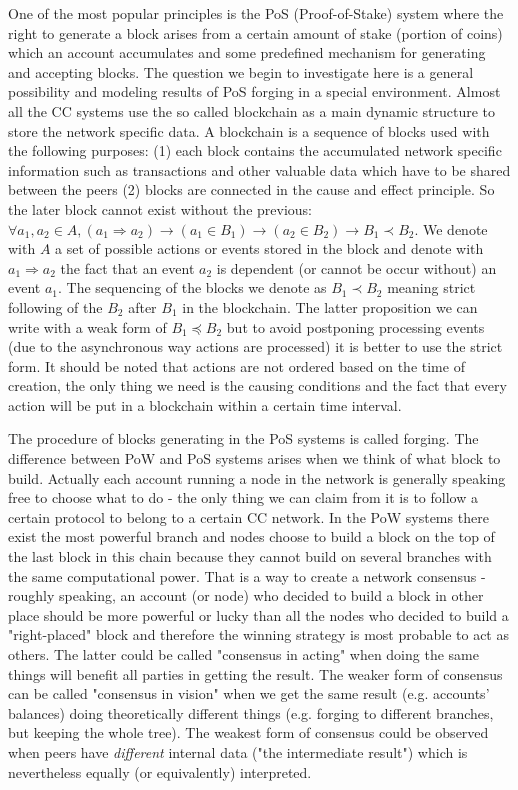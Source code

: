 \documentclass[12pt]{article}
\begin{document}
One of the most popular principles is the PoS 
(Proof-of-Stake) system where the right to generate a block arises from a certain amount of stake (portion of coins) which 
an account accumulates and some predefined mechanism for generating and accepting blocks. The question we begin to investigate here is a 
general possibility and modeling results of PoS forging in a special environment. Almost all the CC systems use the so called blockchain as a 
main dynamic structure to store the network specific data. A blockchain is a sequence of blocks used with the following purposes: (1) each block contains the 
accumulated network specific information such as transactions and other valuable data which have to be shared between the peers 
(2) blocks are connected in the cause and effect principle. So the later block cannot exist without
the previous: $\forall a_1,a_2\in A, (a_1\Rightarrow a_2) \to (a_1\in B_1) \to (a_2\in B_2) \to B_1 \prec B_2$. We denote with $A$ a set of possible actions or 
events stored in the block and denote with $a_1\Rightarrow a_2$ the fact that an event $a_2$ is dependent (or cannot be occur without) an event $a_1$. 
The sequencing of the
blocks we denote as $B_1 \prec B_2$ meaning strict following of the $B_2$ after $B_1$ in the blockchain. The latter proposition we can write with a weak form of
$B_1 \preceq B_2$ but to avoid postponing processing events (due to the asynchronous way actions are processed) it is better to use the strict form.
It should be noted
that actions are not ordered based on the time of creation, the only thing we need is the causing conditions and the fact that every action 
will be put in a blockchain within a certain time interval. 

The procedure of blocks generating in the PoS systems is called forging. The difference between PoW and PoS systems arises when we think
of what block to build. Actually each account running a node in the network is generally speaking free to choose what to do \-- the only thing we can claim from it
is to follow a certain protocol to belong to a certain CC network. In the PoW systems there exist the most powerful branch and nodes choose to 
build a block on the top of the last block in this chain because they cannot build on several branches with the same computational power. That is a way 
to create a network consensus \--
roughly speaking, an account (or node) who decided to build a block in other place should be more powerful or lucky 
than all the nodes who decided to build a "right-placed" block and therefore
the winning strategy is most probable to act as others. 
The latter could be called "consensus in acting" when doing the same things will benefit all parties in getting 
the result. The weaker form of consensus can be called "consensus in vision" when we get the same result (e.g. accounts' balances) 
doing theoretically different things (e.g. forging to different branches, but keeping the whole tree). The weakest form of consensus could be observed when 
peers have {\it different} internal data ("the intermediate result") which is nevertheless equally (or equivalently) interpreted.
 
\end{document}
